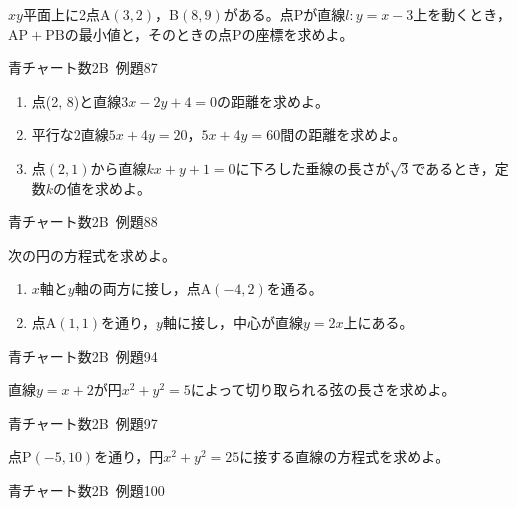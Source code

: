 \documentclass[b4paper, dvipdfmx, 11pt, fleqn, twocolumn, uplatex]{jsarticle}
\begin{document}

\begin{screen}
$xy$平面上に2点A$(3, 2)$，B$(8, 9)$がある。点Pが直線$l:y=x-3$上を動くとき，$\mathrm{AP}+\mathrm{PB}$の最小値と，そのときの点Pの座標を求めよ。
\begin{flushright}
    青チャート数2B~例題87
\end{flushright}
\end{screen}


\begin{screen}
\begin{enumerate}[label={(\arabic*)}]
\item 点(2, 8)と直線$3x-2y+4=0$の距離を求めよ。
\item 平行な2直線$5x+4y=20$，$5x+4y=60$間の距離を求めよ。
\item 点$(2,1)$から直線$kx+y+1=0$に下ろした垂線の長さが$\sqrt{3}$であるとき，定数$k$の値を求めよ。
\end{enumerate}
\begin{flushright}
    青チャート数2B~例題88
\end{flushright}
\end{screen}


\begin{screen}
次の円の方程式を求めよ。
\begin{enumerate}[label={(\arabic*)}]
\item $x$軸と$y$軸の両方に接し，点A$(-4, 2)$を通る。
\item 点A$(1, 1)$を通り，$y$軸に接し，中心が直線$y=2x$上にある。
\end{enumerate}
\begin{flushright}
    青チャート数2B~例題94
\end{flushright}
\end{screen}


\begin{screen}
直線$y=x+2$が円$x^2+y^2=5$によって切り取られる弦の長さを求めよ。
\begin{flushright}
    青チャート数2B~例題97
\end{flushright}
\end{screen}


\begin{screen}
点P$(-5, 10)$を通り，円$x^2+y^2=25$に接する直線の方程式を求めよ。
\begin{flushright}
    青チャート数2B~例題100
\end{flushright}
\end{screen}
\end{document}

